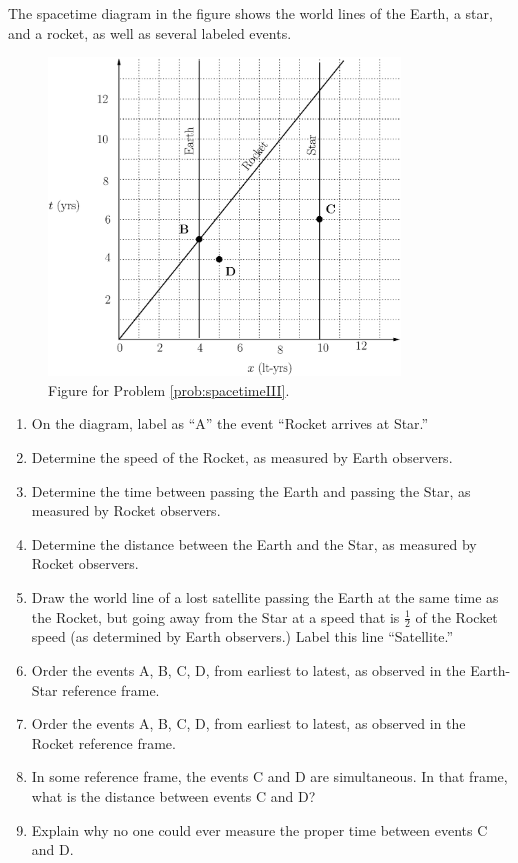 \begin{problem}
The spacetime diagram in the figure shows the world lines of the Earth,
a star, and a rocket, as well as several labeled events.
\begin{figure}[!h]
\begin{center}
\includegraphics[width=3.68in]{relativistic_spacetime/p_spacetimeIII.eps}
\end{center}
\caption{Figure for Problem \ref{prob:spacetimeIII}.}
\end{figure} 
\begin{enumerate}
\item On the diagram, label as ``A'' the event ``Rocket arrives
at Star.''
\item Determine the speed of the Rocket, as measured by Earth
observers.
\item Determine the time between passing the Earth and passing the
Star, as measured by Rocket observers.
\item Determine the distance between the Earth and the Star, as
measured by Rocket observers.
\item Draw the world line of a lost satellite passing the Earth at the
same time as the Rocket, but going away from the Star at a speed that
is $\frac{1}{2}$ of the Rocket speed (as determined by Earth
observers.)  Label this line ``Satellite.''
\item Order the events A, B, C, D, from earliest to latest, as
observed in the Earth-Star reference frame.
\item Order the events A, B, C, D, from earliest to latest, as
observed in the Rocket reference frame.  
\item In some reference frame, the events C and D are simultaneous.
In that frame, what is the distance between events C and D?
\item Explain why no one could ever measure the proper time between
events C and D.  
\end{enumerate}
\label{prob:spacetimeIII}
\end{problem}
